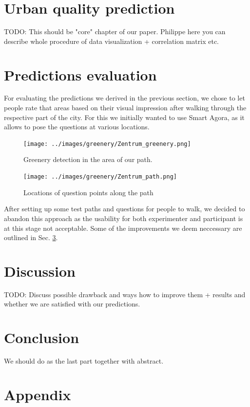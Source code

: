 \documentclass[letterpaper]{article}
\begin{document}
\section{Urban quality prediction}\label{sec:predictions}
TODO: This should be "core" chapter of our paper. Philippe here you can describe whole procedure of data visualization + correlation matrix etc.

\section{Predictions evaluation}\label{sec:exp}
For evaluating the predictions we derived in the previous section, we chose to let people rate that areas based on their visual impression after walking through the respective part of the city. For this we initially wanted to use Smart Agora, as it allows to pose the questions at various locations.

\begin{figure}[htb]
    \centering
    \texttt{[image: ../images/greenery/Zentrum\_greenery.png]}
    \caption{Greenery detection in the area of our path.}
    \label{fig:path_greenery}
\end{figure}

\begin{figure}[htb]
	\centering
	\texttt{[image: ../images/greenery/Zentrum\_path.png]}
	\caption{Locations of question points along the path}
	\label{fig:path_points}
\end{figure}

After setting up some test paths and questions for people to walk, we decided to abandon this approach as the usability for both experimenter and participant is at this stage not acceptable. Some of the improvements we deem neccessary are outlined in Sec. \ref{sec:discussion}.

\section{Discussion}\label{sec:discussion}
TODO: Discuss possible drawback and ways how to improve them + results and whether we are satisfied with our predictions.

\section{Conclusion}\label{sec:conclusion}
We should do as the last part together with abstract.




\section{Appendix}
\end{document}
